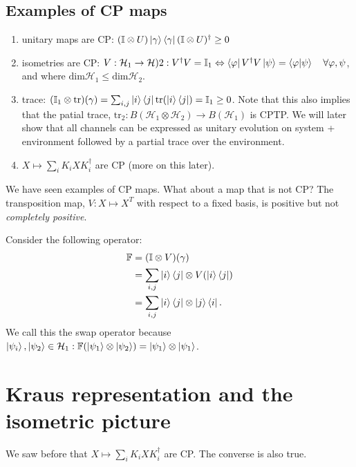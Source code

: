\documentclass[10pt,oneside,longbibliography]{report}
\begin{document}
\subsection{Examples of CP maps}
\begin{enumerate}
    \item unitary maps are CP: $(\mathbb{I}\otimes U) \ket{\gamma} \bra{\gamma} (\mathbb{I}\otimes U)^{\dagger} \geq 0$
    \item isometries are CP: $V:\mathcal{H}_1 \rightarrow \mathcal{H})2: V^{\dagger}V =\mathbb{I}_1 \Leftrightarrow \bra{\varphi} V^{\dagger}V \ket{\psi} = \braket{\varphi|\psi} \quad \forall \varphi,\psi$, and where $\text{dim}\mathcal{H}_1 \leq \text{dim}\mathcal{H}_2$.
    \item trace: $(\mathbb{I}_1 \otimes \text{tr})(\gamma) = \sum_{i,j} \ket{i}\bra{j} \text{tr}(\ket{i}\bra{j}) = \mathbb{I}_1 \geq 0 $. Note that this also implies that the patial trace, $\text{tr}_2: B(\mathcal{H}_1 \otimes \mathcal{H}_2) \rightarrow B(\mathcal{H}_1)$ is CPTP. We will later show that all channels can be expressed as unitary evolution on system + environment followed by a partial trace over the environment. 
    \item $X \mapsto \sum_i K_i X K_i^{\dagger}$ are CP (more on this later).
\end{enumerate}
We have seen examples of CP maps. What about a map that is not CP? The transposition map, $V:X\mapsto X^{T}$ with respect to a fixed basis, is positive but not \textit{completely positive}. 

Consider the following operator:
\begin{align}
    \mathbb{F}&=(\mathbb{I}\otimes V)(\gamma)\\
    &= \sum_{i,j}\ket{i}\bra{j} \otimes V(\ket{i}\bra{j})\\
    &= \sum_{i,j} \ket{i}\bra{j} \otimes \ket{j}\bra{i}.
\end{align}
We call this the swap operator because $\ket{\psi_i},\ket{\psi_2}\in \mathcal{H}_1: \mathbb{F}(\ket{\psi_1}\otimes \ket{\psi_2})=\ket{\psi_1}\otimes \ket{\psi_1}$. 

\section{Kraus representation and the isometric picture}
We saw before that $X\mapsto \sum_i K_i X K_i^{\dagger}$ are CP. The converse is also true. 
\end{document}
